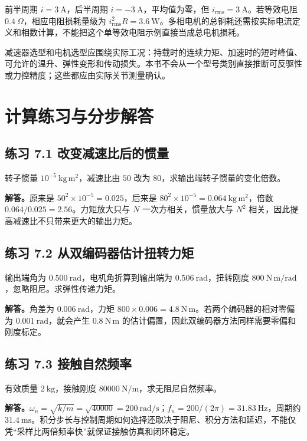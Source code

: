 \begin{examplebox}[算例 7H 平均电流为零仍然发热]
前半周期 $i=3\ \mathrm A$，后半周期 $i=-3\ \mathrm A$，平均值为零，但 $i_{\mathrm{rms}}=3\ \mathrm A$。若等效电阻 $0.4\ \Omega$，相应电阻损耗量级为 $i_{\mathrm{rms}}^2R=3.6\ \mathrm W$。多相电机的总铜耗还需按实际电流定义和相数计算，不能把这个单等效电阻示例直接当成总电机损耗。
\end{examplebox}

减速器选型和电机选型应围绕实际工况：持载时的连续力矩、加速时的短时峰值、可允许的温升、弹性变形和传动损失。本书不会从一个型号类别直接推断可反驱性或力控精度；这些都应由实际关节测量确认。

\section{计算练习与分步解答}
\subsection*{练习 7.1 改变减速比后的惯量}
转子惯量 $10^{-5}\ \mathrm{kg\,m^2}$，减速比由 $50$ 改为 $80$，求输出端转子惯量的变化倍数。

\textbf{解答。}原来是 $50^2\times10^{-5}=0.025$，后来是 $80^2\times10^{-5}=0.064\ \mathrm{kg\,m^2}$，倍数 $0.064/0.025=2.56$。力矩放大只与 $N$ 一次方相关，惯量放大与 $N^2$ 相关，因此提高减速比不只带来更大的输出力矩。

\subsection*{练习 7.2 从双编码器估计扭转力矩}
输出端角为 $0.500\ \mathrm{rad}$，电机角折算到输出端为 $0.506\ \mathrm{rad}$，扭转刚度 $800\ \mathrm{N\,m/rad}$，忽略阻尼。求弹性传递力矩。

\textbf{解答。}角差为 $0.006\ \mathrm{rad}$，力矩 $800\times0.006=4.8\ \mathrm{N\,m}$。若两个编码器的相对零偏为 $0.001\ \mathrm{rad}$，就会产生 $0.8\ \mathrm{N\,m}$ 的估计偏置，因此双编码器方法同样需要零偏和刚度标定。

\subsection*{练习 7.3 接触自然频率}
有效质量 $2\ \mathrm{kg}$，接触刚度 $80000\ \mathrm{N/m}$，求无阻尼自然频率。

\textbf{解答。}$\omega_n=\sqrt{k/m}=\sqrt{40000}=200\ \mathrm{rad/s}$；$f_n=200/(2\pi)=31.83\ \mathrm{Hz}$，周期约 $31.4\ \mathrm{ms}$。积分步长与控制周期如何选择还取决于阻尼、积分方法和延迟，不能仅凭“采样比两倍频率快”就保证接触仿真和闭环稳定。

